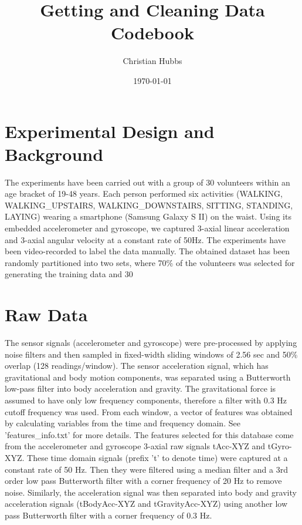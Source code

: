 \documentclass{article}
\begin{document}
\title{Getting and Cleaning Data Codebook}
\author{Christian Hubbs}
\date{\today}
\maketitle

\section{Experimental Design and Background}

The experiments have been carried out with a group of 30 volunteers within an age bracket of 19-48 years. Each person performed six activities (WALKING, WALKING\_UPSTAIRS, WALKING\_DOWNSTAIRS, SITTING, STANDING, LAYING) wearing a smartphone (Samsung Galaxy S II) on the waist. Using its embedded accelerometer and gyroscope, we captured 3-axial linear acceleration and 3-axial angular velocity at a constant rate of 50Hz. The experiments have been video-recorded to label the data manually. The obtained dataset has been randomly partitioned into two sets, where 70\% of the volunteers was selected for generating the training data and 30%

\section{Raw Data}

The sensor signals (accelerometer and gyroscope) were pre-processed by applying noise filters and then sampled in fixed-width sliding windows of 2.56 sec and 50\% overlap (128 readings/window). The sensor acceleration signal, which has gravitational and body motion components, was separated using a Butterworth low-pass filter into body acceleration and gravity. The gravitational force is assumed to have only low frequency components, therefore a filter with 0.3 Hz cutoff frequency was used. From each window, a vector of features was obtained by calculating variables from the time and frequency domain. See 'features\_info.txt' for more details. The features selected for this database come from the accelerometer and gyroscope 3-axial raw signals tAcc-XYZ 
and tGyro-XYZ. These time domain signals (prefix 't' to denote time) were captured at a constant rate of 50 Hz. Then they were filtered using a median filter and a 3rd order low pass Butterworth filter with a corner frequency of 20 Hz to remove noise. Similarly, the acceleration signal was then separated into body and gravity acceleration signals (tBodyAcc-XYZ and tGravityAcc-XYZ) using another low pass Butterworth filter with a corner frequency of 0.3 Hz. \par
\end{document}
